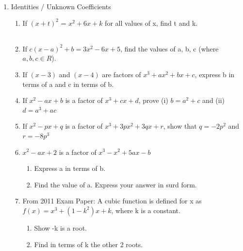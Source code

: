 \documentclass[a4paper,14pt]{extarticle}
\begin{document}
\begin{enumerate}
\begin{enumerate}
\newpage
\end{enumerate}

\vspace*{7cm}
\item Identities / Unknown Coefficients \\[4pt]

\begin{enumerate}
\item{If $(x+t)^2$ = $x^2 + 6x + k$ for all values of x, find t and k.}\\
\noindent{}\\[3pt]
\newpage

\item{If $c(x-a)^2 +b = 3x^2 - 6x + 5$, find the values of a, b, c (where $a, b, c \in \!R $).}
\vspace{10cm}

\item{If $(x-3)$ and $(x-4)$ are factors of $x^3 + ax^2 + bx + c$, express b in terms of a and c in terms of b.}
\newpage

\item{If $x^2 -ax + b$ is a factor of $x^3 + cx + d$, prove (i) $b = a^2 + c$ and (ii) $d = a^3 + ac$}
\newpage

\item{If $x^2 -px + q$ is a factor of $x^3 + 3px^2 + 3qx + r$, show that $q = -2p^2$ and $r = -8p^3$}
\newpage
\vspace*{10cm}
\newpage

\item{$x^2 -ax + 2$ is a factor of $x^3 - x^2 + 5ax - b$}
\begin{enumerate}
\item{Express a in terms of b.}
\item{Find the value of a. Express your answer in surd form.}
\end{enumerate}
\newpage

\item{From 2011 Exam Paper: A cubic function is defined for x as $f(x) = x^3 + (1-k^2)x + k$, where k is a constant.}
\begin{enumerate}
\item{Show -k is a root.}
\item{Find in terms of k the other 2 roots.}
\end{enumerate}
\newpage
\end{enumerate}


\end{enumerate}
\end{document}
